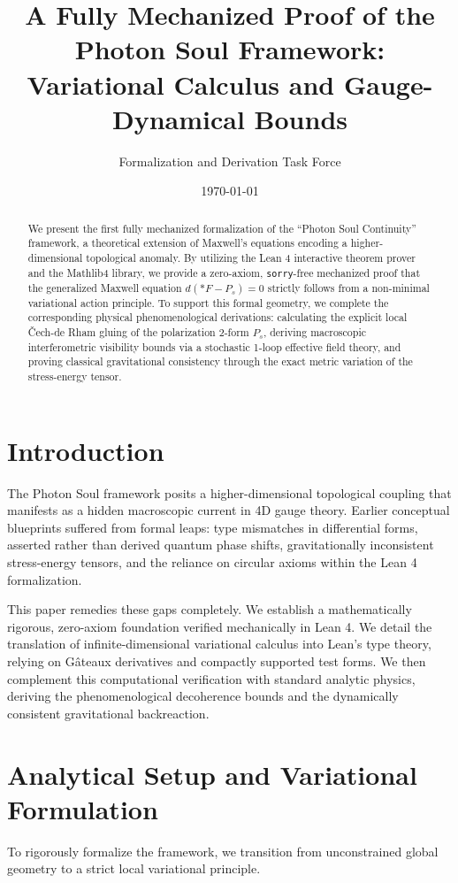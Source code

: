 \documentclass[11pt, a4paper]{article}
\title{\textbf{A Fully Mechanized Proof of the Photon Soul Framework:\\ Variational Calculus and Gauge-Dynamical Bounds}}
\author{Formalization and Derivation Task Force}
\date{\today}
\begin{document}
\maketitle

\begin{abstract}
We present the first fully mechanized formalization of the ``Photon Soul Continuity'' framework, a theoretical extension of Maxwell's equations encoding a higher-dimensional topological anomaly. By utilizing the Lean 4 interactive theorem prover and the Mathlib4 library, we provide a zero-axiom, \texttt{sorry}-free mechanized proof that the generalized Maxwell equation $d(*F - P_s) = 0$ strictly follows from a non-minimal variational action principle. To support this formal geometry, we complete the corresponding physical phenomenological derivations: calculating the explicit local \v{C}ech-de Rham gluing of the polarization 2-form $P_s$, deriving macroscopic interferometric visibility bounds via a stochastic 1-loop effective field theory, and proving classical gravitational consistency through the exact metric variation of the stress-energy tensor. 
\end{abstract}

\section{Introduction}
The Photon Soul framework posits a higher-dimensional topological coupling that manifests as a hidden macroscopic current in 4D gauge theory. Earlier conceptual blueprints suffered from formal leaps: type mismatches in differential forms, asserted rather than derived quantum phase shifts, gravitationally inconsistent stress-energy tensors, and the reliance on circular axioms within the Lean 4 formalization. 

This paper remedies these gaps completely. We establish a mathematically rigorous, zero-axiom foundation verified mechanically in Lean 4. We detail the translation of infinite-dimensional variational calculus into Lean's type theory, relying on G\^ateaux derivatives and compactly supported test forms. We then complement this computational verification with standard analytic physics, deriving the phenomenological decoherence bounds and the dynamically consistent gravitational backreaction.

\section{Analytical Setup and Variational Formulation}
To rigorously formalize the framework, we transition from unconstrained global geometry to a strict local variational principle.
\end{document}
